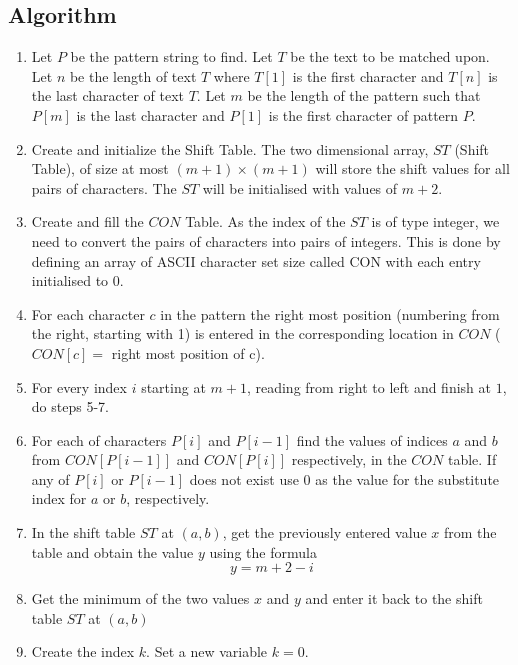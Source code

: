 \subsection{Algorithm}
\begin{enumerate}
\item Let $P$ be the pattern string to find. Let $T$ be the text to be matched upon. Let $n$ be the length of text $T$ where $T[1]$ is the first character and $T[n]$ is the last character of text $T$. Let $m$ be the length of the pattern such that $P[m]$ is the last character and $P[1]$ is the first character of pattern $P$.

\item Create and initialize the Shift Table. The two dimensional array, $ST$ (Shift Table), of size at most $(m+1)\times(m+1)$ will store the shift values for all pairs of characters. The $ST$ will be initialised with values of $m+2$.

\item Create and fill the $CON$ Table. As the index of the $ST$ is of type integer, we need to convert the pairs of characters into pairs of integers. This is done by defining an array of ASCII character set size called CON with each entry initialised to $0$.

\item For each character $c$ in the pattern the right most position (numbering from the right, starting with 1) is entered in the corresponding location in $CON$ ($CON[c]=$ right most position of c).

\item For every index $i$ starting at $m+1$, reading from right to left and finish at $1$, do steps 5-7.

	\item For each of characters $P[i]$ and $P[i-1]$ find the values of indices $a$ and $b$ from $CON[P[i-1]]$ and $CON[P[i]]$ respectively, in the $CON$ table.  If any of $P[i]$ or $P[i-1]$ does not exist use $0$ as the value for the substitute index for $a$ or $b$, respectively.

	\item In the shift table $ST$ at $(a, b)$, get the previously entered value $x$ from the table and obtain the value $y$ using the formula $$ y = m+2-i $$

	\item Get the minimum of the two values $x$ and $y$ and enter it back to the shift table $ST$ at $(a, b)$

\item Create the index $k$. Set a new variable $k=0$.


\end{enumerate}
